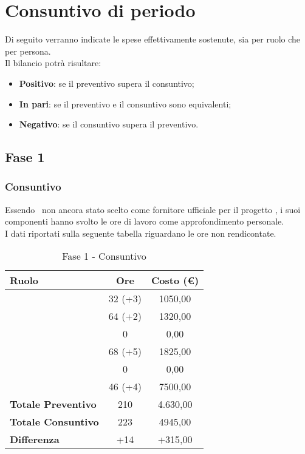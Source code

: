 \documentclass[../PianoDiProgetto.tex]{subfiles}
\begin{document}
	\section{Consuntivo di periodo}
	Di seguito verranno indicate le spese effettivamente sostenute, sia per ruolo che per persona.\\
	Il bilancio potrà risultare:
	\begin{itemize}
		\item \textbf{Positivo}: se il preventivo supera il consuntivo;
		\item \textbf{In pari}: se il preventivo e il consuntivo sono equivalenti;
		\item \textbf{Negativo}: se il consuntivo supera il preventivo.
	\end{itemize}
	
	\subsection{Fase 1}
		\subsubsection{Consuntivo}
		Essendo \kpanic\ non ancora stato scelto come fornitore ufficiale per il progetto \progetto, i suoi componenti hanno svolto le ore di lavoro come approfondimento personale.\\
		I dati riportati sulla seguente tabella riguardano le ore non rendicontate.
		\begin{table}[h]
		\centering
		\begin{tabular}{l * {2}{c}}
			\toprule
			\textbf{Ruolo} & \textbf{Ore} & \textbf{Costo (\euro{})} \\
			\midrule
			\responsabilediprogetto &	32 (+3) & 1050,00 \\

			\amministratore & 64 (+2) & 1320,00 \\
			
			\progettista & 0 & 0,00 \\
			
			\analista & 68 (+5) & 1825,00 \\
			
			\programmatore & 0 & 0,00 \\
			
			\verificatore & 46 (+4) & 7500,00 \\
			
			\midrule
			\textbf{Totale Preventivo} & 210 & 4.630,00 \\		
			\textbf{Totale Consuntivo} & 223 & 4945,00 \\
			\midrule
			\textbf{Differenza} & +14 & +315,00 \\
			\bottomrule
		\end{tabular}
		\caption{Fase 1 - Consuntivo}
		\label{tab:consuntivo1}
	\end{table}	
\end{document}
